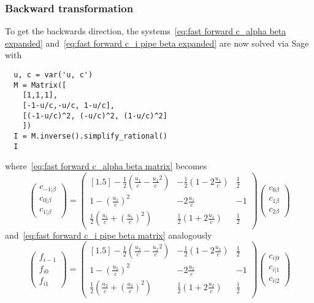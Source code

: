 \documentclass{article}
\begin{document}
\subsubsection{Backward transformation}
\label{subs:Backward transformation}
To get the backwards direction, the systems~\eqref{eq:fast forward c_alpha beta expanded} and~\eqref{eq:fast forward c_i pipe beta expanded} are now solved via Sage with
\begin{verbatim}
  u, c = var('u, c')
  M = Matrix([
    [1,1,1],
    [-1-u/c,-u/c, 1-u/c],
    [(-1-u/c)^2, (-u/c)^2, (1-u/c)^2]
    ])
  I = M.inverse().simplify_rational()
  I
\end{verbatim}
where~\eqref{eq:fast forward c_alpha beta matrix} becomes
\begin{equation}
  \begin{pmatrix}
    c_{-1|\beta} \\
    c_{0|\beta} \\
    c_{1|\beta}
  \end{pmatrix}
  =
  \begin{pmatrix}[1.5]
    -\frac{1}{2}(\frac{u_1}{c} - \frac{u_1}{c}^2) &
    -\frac{1}{2}(1 - 2\frac{u_1}{c}) &
    \frac{1}{2} \\
    1 - {(\frac{u_1}{c})}^2  &
    -2\frac{u_1}{c}  &
    -1 \\
    \frac{1}{2}(\frac{u_1}{c} + {(\frac{u_1}{c})}^2)  &
    \frac{1}{2}(1 + 2\frac{u_1}{c})  &
    \frac{1}{2}
  \end{pmatrix}
  \begin{pmatrix}
    c_{0\beta} \\
    c_{1\beta} \\
    c_{2\beta}
  \end{pmatrix}
\end{equation}
and~\eqref{eq:fast forward c_i pipe beta matrix} analogously
\begin{equation}
  \begin{pmatrix}
    f_{i-1} \\
    f_{i0} \\
    f_{i1}
  \end{pmatrix}
  =
  \begin{pmatrix}[1.5]
    -\frac{1}{2}(\frac{u_2}{c} - \frac{u_2}{c}^2) &
    -\frac{1}{2}(1 - 2\frac{u_2}{c}) &
    \frac{1}{2} \\
    1 - {(\frac{u_2}{c})}^2  &
    -2\frac{u_2}{c}  &
    -1 \\
    \frac{1}{2}(\frac{u_2}{c} + {(\frac{u_2}{c})}^2)  &
    \frac{1}{2}(1 + 2\frac{u_2}{c})  &
    \frac{1}{2}
  \end{pmatrix}
  \begin{pmatrix}
      c_{i|0} \\
      c_{i|1} \\
      c_{i|2}
    \end{pmatrix}
\end{equation}
\end{document}
